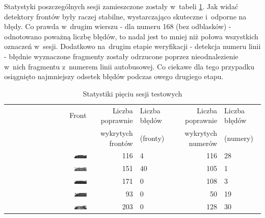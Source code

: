 Statystyki poszczególnych sesji zamieszczone zostały w~tabeli
\ref{tab:5usecasesStats}. Jak widać detektory frontów
były raczej stabilne, wystarczająco skuteczne i~odporne 
na błędy. Co prawda w~drugim wierszu - dla numeru 168 (bez odblasków)
- odnotowano poważną liczbę błędów, to nadal jest to 
mniej niż połowa wszystkich oznaczeń w~sesji. Dodatkowo
na~drugim etapie weryfikacji - detekcja numeru linii - błędnie 
wyznaczone fragmenty zostały odrzucone poprzez 
nieodnalezienie w~nich fragmentu
z~numerem linii autobusowej. Co ciekawe dla tego
przypadku osiągnięto najmniejszy odsetek błędów
podczas owego drugiego etapu. 

\begin{table}[!h]
	\centering                                                          
	\caption{Statystiki pięciu sesji testowych}
	\begin{tabular}{r|r|l|r|l}
		Front    & Liczba poprawnie     & Liczba błędów  & Liczba poprawnie   & Liczba błędów     \\
		         & wykrytych frontów    & (fronty)        & wykrytych numerów  & (numery)  \\
		\hline
		\includegraphics[width=0.15\textwidth]{img/5sessions/01-148} & 116 & 4 & 116 & 28 \\
		\includegraphics[width=0.15\textwidth]{img/5sessions/02-168} & 151 & 40 & 105 & 1 \\
		\includegraphics[width=0.15\textwidth]{img/5sessions/03-148} & 171 & 0 & 108 & 3  \\
		\includegraphics[width=0.15\textwidth]{img/5sessions/04-111} & 93  & 0 & 50 & 19 \\
		\includegraphics[width=0.15\textwidth]{img/5sessions/05-168} & 203 & 0 & 128 & 30 \\
	\end{tabular} 
	\label{tab:5usecasesStats}
\end{table}

